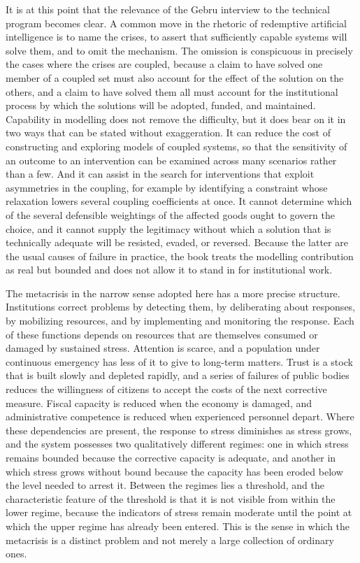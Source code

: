 It is at this point that the relevance of the Gebru interview to the technical program becomes clear. A common move in the rhetoric of redemptive artificial intelligence is to name the crises, to assert that sufficiently capable systems will solve them, and to omit the mechanism. The omission is conspicuous in precisely the cases where the crises are coupled, because a claim to have solved one member of a coupled set must also account for the effect of the solution on the others, and a claim to have solved them all must account for the institutional process by which the solutions will be adopted, funded, and maintained. Capability in modelling does not remove the difficulty, but it does bear on it in two ways that can be stated without exaggeration. It can reduce the cost of constructing and exploring models of coupled systems, so that the sensitivity of an outcome to an intervention can be examined across many scenarios rather than a few. And it can assist in the search for interventions that exploit asymmetries in the coupling, for example by identifying a constraint whose relaxation lowers several coupling coefficients at once. It cannot determine which of the several defensible weightings of the affected goods ought to govern the choice, and it cannot supply the legitimacy without which a solution that is technically adequate will be resisted, evaded, or reversed. Because the latter are the usual causes of failure in practice, the book treats the modelling contribution as real but bounded and does not allow it to stand in for institutional work.

The metacrisis in the narrow sense adopted here has a more precise structure. Institutions correct problems by detecting them, by deliberating about responses, by mobilizing resources, and by implementing and monitoring the response. Each of these functions depends on resources that are themselves consumed or damaged by sustained stress. Attention is scarce, and a population under continuous emergency has less of it to give to long-term matters. Trust is a stock that is built slowly and depleted rapidly, and a series of failures of public bodies reduces the willingness of citizens to accept the costs of the next corrective measure. Fiscal capacity is reduced when the economy is damaged, and administrative competence is reduced when experienced personnel depart. Where these dependencies are present, the response to stress diminishes as stress grows, and the system possesses two qualitatively different regimes: one in which stress remains bounded because the corrective capacity is adequate, and another in which stress grows without bound because the capacity has been eroded below the level needed to arrest it. Between the regimes lies a threshold, and the characteristic feature of the threshold is that it is not visible from within the lower regime, because the indicators of stress remain moderate until the point at which the upper regime has already been entered. This is the sense in which the metacrisis is a distinct problem and not merely a large collection of ordinary ones.

